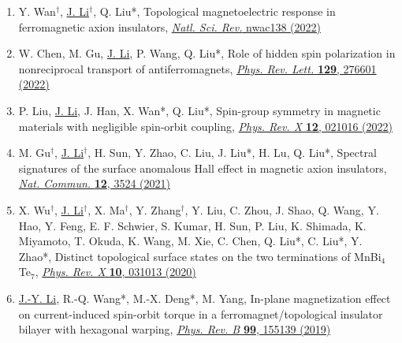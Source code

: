 \documentclass[a4paper,11pt]{article}
\begin{document}
\begin{enumerate}[leftmargin=*]
    \item Y. Wan$^{\dagger}$, \underline{J. Li$^{\dagger}$}, Q. Liu*, Topological magnetoelectric response in ferromagnetic axion insulators, \href{https://academic.oup.com/nsr/advance-article/doi/10.1093/nsr/nwac138/6648715}{\textit{Natl. Sci. Rev.} nwac138 (2022)} 

    \item W. Chen, M. Gu, \underline{J. Li}, P. Wang, Q. Liu*, Role of hidden spin polarization in nonreciprocal transport of antiferromagnets, \href{https://journals.aps.org/prl/abstract/10.1103/PhysRevLett.129.276601}{\textit{Phys. Rev. Lett.} \textbf{129}, 276601 (2022)}

    \item P. Liu, \underline{J. Li}, J. Han, X. Wan*, Q. Liu*, Spin-group symmetry in magnetic materials with negligible spin-orbit coupling, \href{https://journals.aps.org/prx/abstract/10.1103/PhysRevX.12.021016}{\textit{Phys. Rev. X} \textbf{12}, 021016 (2022)}

    \item M. Gu$^{\dagger}$, \underline{J. Li$^{\dagger}$}, H. Sun, Y. Zhao, C. Liu, J. Liu*, H. Lu, Q. Liu*, Spectral signatures of the surface anomalous Hall effect in magnetic axion insulators, \href{https://www.nature.com/articles/s41467-021-23844-z}{\textit{Nat. Commun.} \textbf{12}, 3524 (2021)}  

    \item X. Wu$^{\dagger}$, \underline{J. Li$^{\dagger}$}, X. Ma$^{\dagger}$, Y. Zhang$^{\dagger}$, Y. Liu, C. Zhou, J. Shao, Q. Wang, Y. Hao, Y. Feng, E. F. Schwier, S. Kumar, H. Sun, P. Liu, K. Shimada, K. Miyamoto, T. Okuda, K. Wang, M. Xie, C. Chen, Q. Liu*, C. Liu*, Y. Zhao*, Distinct topological surface states on the two terminations of MnBi$_{4}$Te$_{7}$, \href{https://journals.aps.org/prx/abstract/10.1103/PhysRevX.10.031013}{\textit{Phys. Rev. X} \textbf{10}, 031013 (2020)}

    \item \underline{J.-Y. Li}, R.-Q. Wang*, M.-X. Deng*, M. Yang, In-plane magnetization effect on current-induced spin-orbit torque in a ferromagnet/topological insulator bilayer with hexagonal warping, \href{https://journals.aps.org/prb/abstract/10.1103/PhysRevB.99.155139}{\textit{Phys. Rev. B} \textbf{99}, 155139 (2019)}

\end{enumerate}
\end{document}

